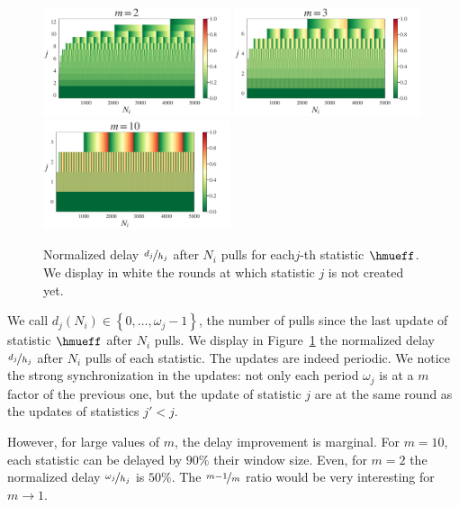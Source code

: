 \begin{figure}[ht]
\centering
\includegraphics[clip, width= 0.49\textwidth]{2.1Rested/fig/T=5000_m=2.pdf}
\includegraphics[clip, width= 0.49\textwidth]{2.1Rested/fig/T=5000_m=3.pdf}
\includegraphics[clip, width= 0.49\textwidth]{2.1Rested/fig/T=5000_m=10.pdf}
\caption{Normalized delay $\nicefrac{d_j}{h_j}$ after $N_i$ pulls for each$j$-th statistic $\hmueff$. We display in white the rounds at which statistic $j$ is not created yet.}
\label{fig:delay-int}
\end{figure}

We call $d_j(N_i) \in \left\{0, \dots, \omega_j-1 \right\}$, the number of pulls since the last update of statistic $\hmueff$ after $N_i$ pulls. We display in Figure~\ref{fig:delay-int}  
the normalized delay $\nicefrac{d_j}{h_j}$ after $N_i$ pulls of each statistic. The updates are indeed periodic. We notice the strong synchronization in the updates: not only each period $\omega_j$ is at a $m$ factor of the previous one, but the update of statistic $j$ are at the same round as the updates of statistics $j'<j$. %

However, for large values of $m$, the delay improvement is marginal. For $m=10$, each statistic can be delayed by $90\%$ their window size. Even, for $m=2$ the normalized delay $\nicefrac{\omega_j}{h_j}$ is $50\%$. The $\nicefrac{m-1}{m}$ ratio would be very interesting for $m \rightarrow 1$. 

